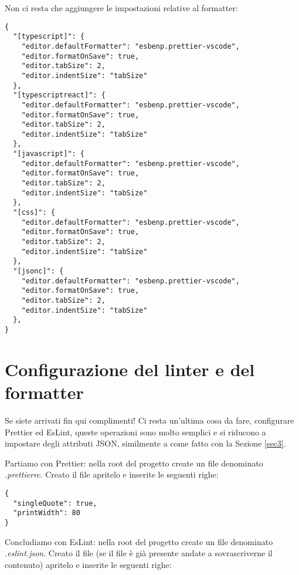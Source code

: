 Non ci resta che aggiungere le impostazioni relative al formatter:
\begin{verbatim}
{
  "[typescript]": {
    "editor.defaultFormatter": "esbenp.prettier-vscode",
    "editor.formatOnSave": true,
    "editor.tabSize": 2,
    "editor.indentSize": "tabSize"
  },
  "[typescriptreact]": {
    "editor.defaultFormatter": "esbenp.prettier-vscode",
    "editor.formatOnSave": true,
    "editor.tabSize": 2,
    "editor.indentSize": "tabSize"
  },
  "[javascript]": {
    "editor.defaultFormatter": "esbenp.prettier-vscode",
    "editor.formatOnSave": true,
    "editor.tabSize": 2,
    "editor.indentSize": "tabSize"
  },
  "[css]": {
    "editor.defaultFormatter": "esbenp.prettier-vscode",
    "editor.formatOnSave": true,
    "editor.tabSize": 2,
    "editor.indentSize": "tabSize"
  },
  "[jsonc]": {
    "editor.defaultFormatter": "esbenp.prettier-vscode",
    "editor.formatOnSave": true,
    "editor.tabSize": 2,
    "editor.indentSize": "tabSize"
  },
}
\end{verbatim}

\newpage

\section{Configurazione del linter e del formatter}
Se siete arrivati fin qui complimenti! Ci resta un'ultima cosa da fare, configurare Prettier ed EsLint, queste operazioni sono molto semplici e si riducono a impostare degli attributi JSON, similmente a come fatto con la Sezione \ref{sec3}.

Partiamo con Prettier: nella root del progetto create un file denominato \textit{.prettierrc}. Creato il file apritelo e inserite le seguenti righe:
\begin{verbatim}
{
  "singleQuote": true,
  "printWidth": 80   
}
\end{verbatim}

Concludiamo con EsLint: nella root del progetto create un file denominato \textit{.eslint.json}. Creato il file (se il file è già presente andate a sovrascriverne il contenuto) apritelo e inserite le seguenti righe:
 
